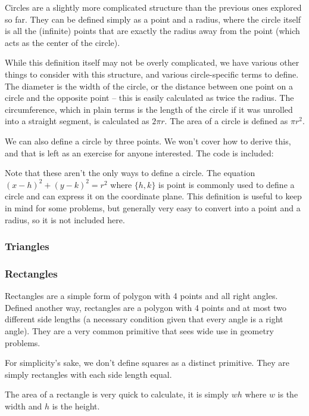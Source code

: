 Circles are a slightly more complicated structure than the previous ones explored so far. They can be defined simply as a point and a radius, where the circle itself is all the (infinite) points that are exactly the radius away from the point (which acts as the center of the circle).

While this definition itself may not be overly complicated, we have various other things to consider with this structure, and various circle-specific terms to define. The diameter is the width of the circle, or the distance between one point on a circle and the opposite point -- this is easily calculated as twice the radius. The circumference, which in plain terms is the length of the circle if it was unrolled into a straight segment, is calculated as $2 \pi r$. The area of a circle is defined as $\pi r^2$.

We can also define a circle by three points. We won't cover how to derive this, and that is left as an exercise for anyone interested. The code is included:


Note that these aren't the only ways to define a circle. The equation $(x-h)^2 + (y-k)^2 = r^2$ where $\{h,k\}$ is point is commonly used to define a circle and can express it on the coordinate plane. This definition is useful to keep in mind for some problems, but generally very easy to convert into a point and a radius, so it is not included here.

\subsubsection{Triangles}

\subsubsection{Rectangles}
 

Rectangles are a simple form of polygon with 4 points and all right angles. Defined another way, rectangles are a polygon with 4 points and at most two different side lengths (a necessary condition given that every angle is a right angle). They are a very common primitive that sees wide use in geometry problems.

For simplicity's sake, we don't define squares as a distinct primitive. They are simply rectangles with each side length equal.

The area of a rectangle is very quick to calculate, it is simply $wh$ where $w$ is the width and $h$ is the height.

